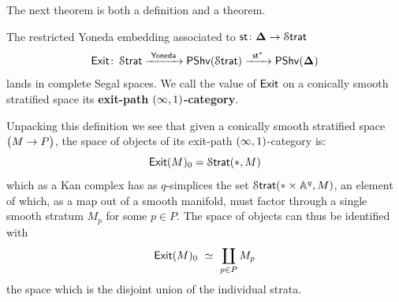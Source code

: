The next theorem is both a definition and a theorem.

\begin{theorem}\cite[Corollary 3.3.6]{AFR1}
    The restricted Yoneda embedding associated to $\mathsf{st}\colon \mathbf\Delta \rightarrow \operatorname{\mathcal S\mathsf{trat}}$ 
    \begin{equation}
    \operatorname{\sf Exit} \colon \operatorname{\mathcal S\mathsf{trat}} \xrightarrow{\,\,\mathsf{Yoneda}\,\,} \operatorname{\sf PShv}(\operatorname{\mathcal S\mathsf{trat}}) \xrightarrow{\,\,\,\mathsf{st}^{*}\,\,\,} \operatorname{\sf PShv}(\mathbf\Delta)
    \end{equation}
    lands in complete Segal spaces. We call the value of $\operatorname{\sf Exit}$ on a conically smooth stratified space its \textbf{exit-path $(\operatorname{\infty},1)$-category}. 
\end{theorem}

\begin{observation}
Unpacking this definition we see that given a conically smooth stratified space $\big(M \rightarrow P\big)$, the space of objects of its exit-path $(\operatorname{\infty},1)$-category is:
\begin{equation}
    \operatorname{\sf Exit}(M)_{0} = \operatorname{\mathcal S\mathsf{trat}}(*,M)
\end{equation}
which as a Kan complex has as $q$-simplices the set $\operatorname{\mathcal S\mathsf{trat}}(*\times \mathbb A^q, M)$, an element of which, as a map out of a smooth manifold, must factor through a single smooth stratum $M_p$ for some $p\in P$. The space of objects can thus be identified with
\begin{equation}
    \operatorname{\sf Exit}(M)_{0} \,\, \simeq \,\, \coprod_{p \in P} M_p
\end{equation} 
the space which is the disjoint union of the individual strata.
\end{observation}

